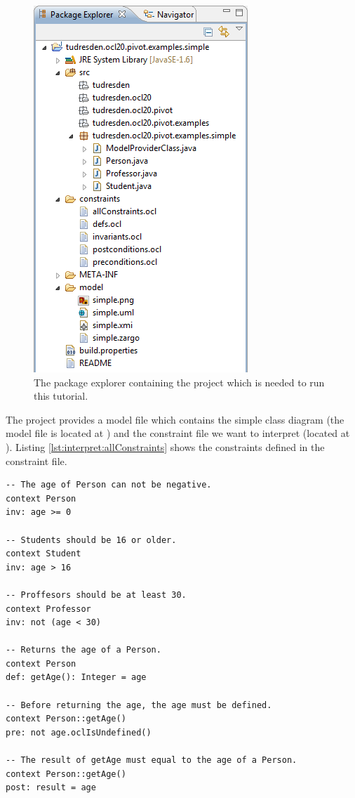 \begin{figure}[!htbp]
	\centering
	\includegraphics[width=0.6\linewidth]{figures/examples/simple02}
	\caption{The package explorer containing the project which is needed to run this tutorial.}
	\label{pic:example:simple02}
\end{figure}

The project provides a model file which contains the simple class diagram (the model file is located at ) and the constraint file we want to interpret (located at ). Listing \ref{lst:interpret:allConstraints} shows the constraints defined in the constraint file.

\lstset{
  language=OCL
}
\begin{lstlisting}[caption={The constraints contained in the constraint file.}, captionpos=b, label=lst:interpret:allConstraints, float]
-- The age of Person can not be negative.
context Person
inv: age >= 0

-- Students should be 16 or older.
context Student
inv: age > 16

-- Proffesors should be at least 30.
context Professor
inv: not (age < 30)

-- Returns the age of a Person.
context Person
def: getAge(): Integer = age

-- Before returning the age, the age must be defined.
context Person::getAge()
pre: not age.oclIsUndefined()

-- The result of getAge must equal to the age of a Person.
context Person::getAge()
post: result = age
\end{lstlisting}

